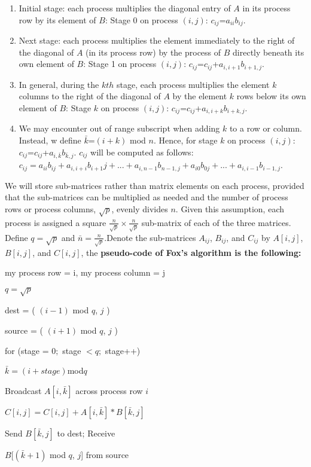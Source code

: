 \documentclass[]{scrartcl}
\begin{document}
\begin{enumerate}
	\item Initial stage: each process multiplies the diagonal entry of $A$ in its process row by its element of $B$: \newline
	Stage 0 on process $(i,j)$: $c_{ij}$=$a_{ii}b_{ij}$.
	\item Next stage: each process multiplies the element immediately to the right of the diagonal of $A$ (in its process row) by the process of $B$ directly beneath its own element of $B$: \newline
	Stage 1 on process $(i,j)$: $c_{ij}$=$c_{ij}$+$a_{i,i+1}b_{i+1,j}$. 
	\item In general, during the $kth$ stage, each process multiplies the element $k$ columns to the right of the diagonal of $A$ by the element $k$ rows below its own element of $B$: \newline
	Stage $k$ on process $(i,j)$: $c_{ij}$=$c_{ij}$+$a_{i,i+k}b_{i+k,j}$.
	\item We may encounter out of range subscript when adding $k$ to a row or column. Instead, w define $\bar{k}$=$(i+k)$ mod $n$. Hence, for  stage $k$ on process $(i,j)$: $c_{ij}$=$c_{ij}$+$a_{i,\bar{k}}b_{\bar{k},j}$. \newline
	$c_{ij}$ will be computed as follows: \newline
	$c_{ij}=a_{ii}b_{ij}+a_{i,i+i}b_{i+1}{j}+...+a_{i,n-1}b_{n-1,j}+a_{i0}b_{0j}+...+a_{i,i-1}b_{i-1,j}$.
\end{enumerate} 
We will store sub-matrices rather than matrix elements on each process, provided that  the sub-matrices can be multiplied as needed and the number of process rows or process columns, $\sqrt{p}$, evenly divides $n$. Given this assumption, each process is assigned a square $\frac{n}{\sqrt{p}}\times\frac{n}{\sqrt{p}}$ sub-matrix of each of the three matrices. Define $q=\sqrt{p}$ and $\bar{n}=\frac{n}{\sqrt{p}}$.Denote the sub-matrices $A_{ij}$, $B_{ij}$, and $C_{ij}$ by $A[i,j]$, $B[i,j]$, and $C[i,j]$, the \textbf{pseudo-code of Fox's algorithm is the following:}
\begin{enumerate}
	\item my process row = i, my process column = j
	\item $q=\sqrt{p}$
	\item dest = ( $(i-1)$ mod $q$, $j$ )
	\item source = ( $(i+1)$ mod $q$, $j$ )
	\item for (stage = 0$;$ stage $<q;$ stage++) 
	{\setlength\itemindent{25pt} \item $\bar{k}=(i+stage)$mod$q$}
	{\setlength\itemindent{25pt} \item Broadcast $A[i,\bar{k}]$ across process row $i$}
	{\setlength\itemindent{25pt} \item $C[i,j]=C[i,j]+A[i,\bar{k}]*B[\bar{k},j]$}
	{\setlength\itemindent{25pt} \item Send $B[\bar{k},j]$ to dest; Receive}
	{\setlength\itemindent{25pt} \item $B[(\bar{k}+1)$ mod $q$, $j$] from source}
\end{enumerate}
\end{document}
